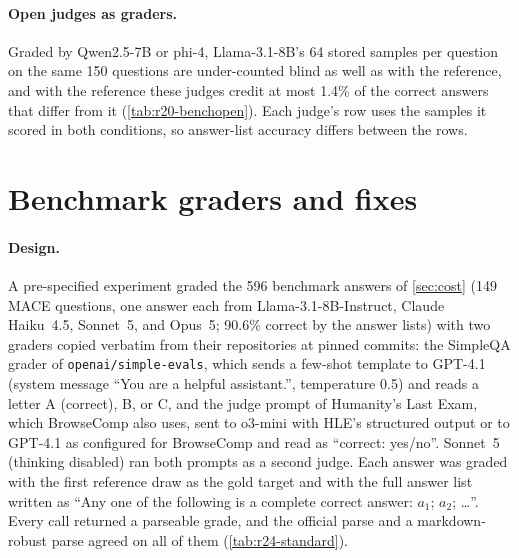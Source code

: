 \paragraph{Open judges as graders.}
Graded by Qwen2.5-7B or phi-4, Llama-3.1-8B's 64 stored samples per question on the same 150 questions are under-counted blind as well as with the reference, and with the reference these judges credit at most 1.4\% of the correct answers that differ from it (\cref{tab:r20-benchopen}).\ph{} Each judge's row uses the samples it scored in both conditions, so answer-list accuracy differs between the rows.

\begin{table}[htbp]
\centering
\caption{Open judges as graders of Llama-3.1-8B's stored samples on the 150 multi-answer \textsc{MACE} questions (a score of 7 or above counts as correct; question-level bootstrap).\ph}
\label{tab:r20-benchopen}
\footnotesize

\end{table}

\FloatBarrier
\section{Benchmark graders and fixes}
\label{app:r24}

\paragraph{Design.} A pre-specified experiment graded the 596 benchmark answers of \cref{sec:cost} (149 \textsc{MACE} questions, one answer each from Llama-3.1-8B-Instruct, Claude Haiku~4.5, Sonnet~5, and Opus~5; 90.6\% correct by the answer lists) with two graders copied verbatim from their repositories at pinned commits: the SimpleQA grader of \texttt{openai/simple-evals}, which sends a few-shot template to GPT-4.1 (system message ``You are a helpful assistant.'', temperature 0.5) and reads a letter A (correct), B, or C, and the judge prompt of Humanity's Last Exam, which BrowseComp also uses, sent to o3-mini with HLE's structured output or to GPT-4.1 as configured for BrowseComp and read as ``correct: yes/no''. Sonnet~5 (thinking disabled) ran both prompts as a second judge. Each answer was graded with the first reference draw as the gold target and with the full answer list written as ``Any one of the following is a complete correct answer: $a_1$; $a_2$; \dots''. Every call returned a parseable grade, and the official parse and a markdown-robust parse agreed on all of them (\cref{tab:r24-standard}).

